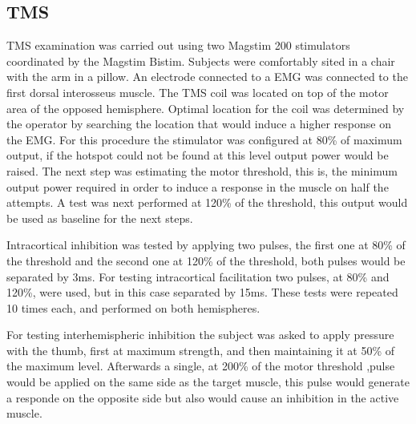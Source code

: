 \subsection{TMS}

TMS examination was carried out using two Magstim 200 stimulators coordinated by the Magstim Bistim. Subjects were comfortably sited in a chair with the arm in a pillow. An electrode connected to a EMG was connected to the first dorsal interosseus muscle. The TMS coil was located on top of the motor area of the opposed hemisphere. Optimal location for the coil was determined by the operator by searching the location that would induce a higher response on the EMG. For this procedure the stimulator was configured at 80\% of maximum output, if the hotspot could not be found at this level output power would be raised. The next step was estimating the motor threshold, this is, the minimum output power required in order to induce a response in the muscle on half the attempts. A test was next performed at 120\% of the threshold, this output would be used as baseline for the next steps.


Intracortical inhibition was tested by applying two pulses, the first one at 80\% of the threshold and the second one at 120\% of the threshold, both pulses would be separated by 3ms. For testing intracortical facilitation two pulses, at 80\% and 120\%, were used, but in this case separated by 15ms. These tests were repeated 10 times each, and performed on both hemispheres.

For testing interhemispheric inhibition the subject was asked to apply pressure with the thumb, first at maximum strength, and then maintaining it at 50\% of the maximum level. Afterwards a single, at 200\% of the motor threshold ,pulse would be applied on the same side as the target muscle, this pulse would generate a responde on the opposite side but also would cause an inhibition in the active muscle. 


